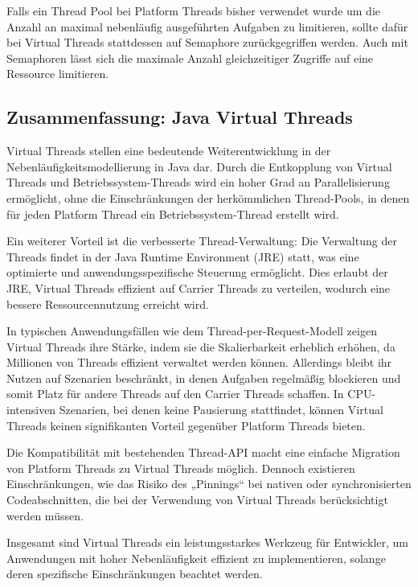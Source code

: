\documentclass[fontsize=12pt,paper=a4,twoside=semi,parskip=half-,headsepline,headinclude]{scrreprt}
\begin{document}
Falls ein Thread Pool bei Platform Threads bisher verwendet wurde um die Anzahl an maximal nebenläufig ausgeführten Aufgaben zu limitieren, sollte dafür bei Virtual Threads stattdessen auf Semaphore zurückgegriffen werden. Auch mit Semaphoren lässt sich die maximale Anzahl gleichzeitiger Zugriffe auf eine Ressource limitieren.

\subsection{Zusammenfassung: Java Virtual Threads}

Virtual Threads stellen eine bedeutende Weiterentwicklung in der Nebenläufigkeits\-mo\-del\-lie\-rung in Java dar. Durch die Entkopplung von Virtual Threads und Betriebssystem-Threads wird ein hoher Grad an Parallelisierung ermöglicht, ohne die Einschränkungen der herkömmlichen Thread-Pools, in denen für jeden Platform Thread ein Betriebssystem-Thread erstellt wird.

Ein weiterer Vorteil ist die verbesserte Thread-Verwaltung: Die Verwaltung der Threads findet in der Java Runtime Environment (JRE) statt, was eine optimierte und anwendungsspezifische Steuerung ermöglicht. Dies erlaubt der JRE, Virtual Threads effizient auf Carrier Threads zu verteilen, wodurch eine bessere Ressourcennutzung erreicht wird.

In typischen Anwendungsfällen wie dem Thread-per-Request-Modell zeigen Virtual Threads ihre Stärke, indem sie die Skalierbarkeit erheblich erhöhen, da Millionen von Threads effizient verwaltet werden können. Allerdings bleibt ihr Nutzen auf Szenarien beschränkt, in denen Aufgaben regelmäßig blockieren und somit Platz für andere Threads auf den Carrier Threads schaffen. In CPU-intensiven Szenarien, bei denen keine Pausierung stattfindet, können Virtual Threads keinen signifikanten Vorteil gegenüber Platform Threads bieten.

Die Kompatibilität mit bestehenden Thread-API macht eine einfache Migration von Platform Threads zu Virtual Threads möglich. Dennoch existieren Einschränkungen, wie das Risiko des „Pinnings“ bei nativen oder synchronisierten Codeabschnitten, die bei der Verwendung von Virtual Threads berücksichtigt werden müssen.

Insgesamt sind Virtual Threads ein leistungsstarkes Werkzeug für Entwickler, um Anwendungen mit hoher Nebenläufigkeit effizient zu implementieren, solange deren spezifische Einschränkungen beachtet werden.

\newpage
\end{document}
